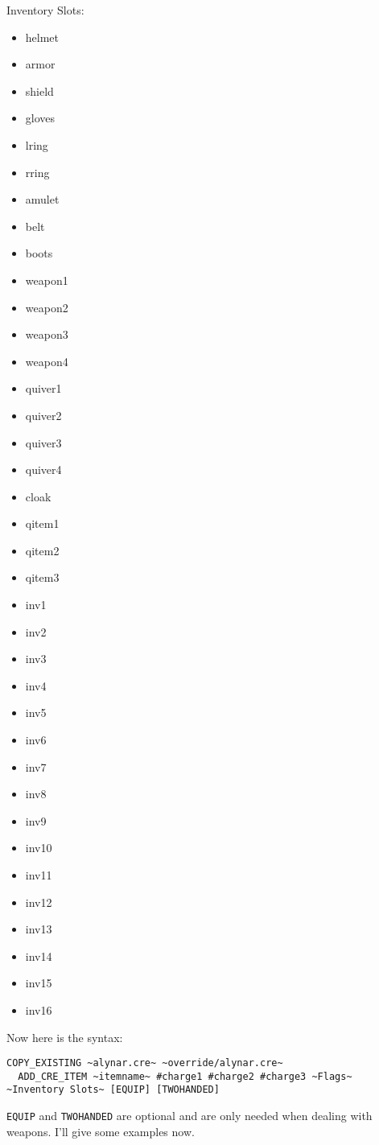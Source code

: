 \documentclass{article}
\def\t#1{{\tt #1}}
\begin{document}
Inventory Slots:
\begin{itemize}
\item helmet
\item armor
\item shield
\item gloves
\item lring
\item rring
\item amulet
\item belt
\item boots
\item weapon1
\item weapon2
\item weapon3
\item weapon4
\item quiver1
\item quiver2
\item quiver3
\item quiver4
\item cloak
\item qitem1
\item qitem2
\item qitem3
\item inv1
\item inv2
\item inv3
\item inv4
\item inv5
\item inv6
\item inv7
\item inv8
\item inv9
\item inv10
\item inv11
\item inv12
\item inv13
\item inv14
\item inv15
\item inv16
\end{itemize}

Now here is the syntax:

\begin{verbatim}
COPY_EXISTING ~alynar.cre~ ~override/alynar.cre~
  ADD_CRE_ITEM ~itemname~ #charge1 #charge2 #charge3 ~Flags~ ~Inventory Slots~ [EQUIP] [TWOHANDED]
\end{verbatim}

\t{EQUIP} and \t{TWOHANDED} are optional and are only needed when dealing
with weapons.  I'll give some examples now.
\end{document}
